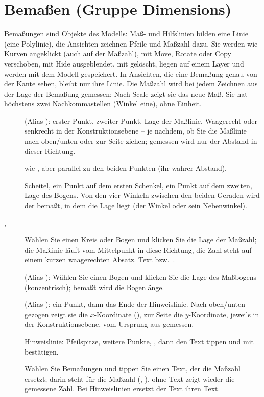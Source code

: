 \section{Bemaßen (Gruppe Dimensions)}\label{sec:gruppe-dimensions}

Bemaßungen sind Objekte des Modells: Maß- und Hilfslinien bilden eine Linie (eine Polylinie), die
Ansichten zeichnen Pfeile und Maßzahl dazu. Sie werden wie Kurven angeklickt (auch auf der
Maßzahl), mit Move, Rotate oder Copy verschoben, mit Hide ausgeblendet, mit 
gelöscht, liegen auf einem Layer und werden mit dem Modell gespeichert. In Ansichten, die eine
Bemaßung genau von der Kante sehen, bleibt nur ihre Linie. Die Maßzahl wird bei
jedem Zeichnen aus der Lage der Bemaßung gemessen: Nach Scale zeigt sie das neue Maß. Sie hat
höchstens zwei Nachkommastellen (Winkel eine), ohne Einheit.

\begin{description}
\item[] (Alias ): erster Punkt, zweiter Punkt, Lage der Maßlinie.
  Waagerecht oder senkrecht in der Konstruktionsebene -- je nachdem, ob Sie die Maßlinie nach
  oben/unten oder zur Seite ziehen; gemessen wird nur der Abstand in dieser Richtung.
\item[] wie , aber parallel zu den beiden Punkten (ihr wahrer
  Abstand).
\item[] Scheitel, ein Punkt auf dem ersten Schenkel, ein Punkt auf dem zweiten,
  Lage des Bogens. Von den vier Winkeln zwischen den beiden Geraden wird der bemaßt, in dem die
  Lage liegt (der Winkel oder sein Nebenwinkel).
\item[, ] Wählen Sie einen Kreis oder Bogen und klicken Sie die
  Lage der Maßzahl; die Maßlinie läuft vom Mittelpunkt in diese Richtung, die Zahl steht auf
  einem kurzen waagerechten Absatz. Text  bzw.\
  .
\item[] (Alias ): Wählen Sie einen Bogen und klicken Sie die Lage
  des Maßbogens (konzentrisch); bemaßt wird die Bogenlänge.
\item[] (Alias ): ein Punkt, dann das Ende der Hinweislinie.
  Nach oben/unten gezogen zeigt sie die $x$-Koordinate (\code{X 12.5}), zur Seite die
  $y$-Koordinate, jeweils in der Konstruktionsebene, vom Ursprung aus gemessen.
\item[\cmd{leader}] Hinweislinie: Pfeilspitze, weitere Punkte, , dann den Text tippen
  und mit \keys{Enter} bestätigen.
\item[] Wählen Sie Bemaßungen und tippen Sie einen Text, der die Maßzahl ersetzt;
  \code{<>} darin steht für die Maßzahl (\code{<> H7}, \code{2x <>}). \keys{Enter} ohne Text zeigt
  wieder die gemessene Zahl. Bei Hinweislinien ersetzt der Text ihren Text.
\end{description}

